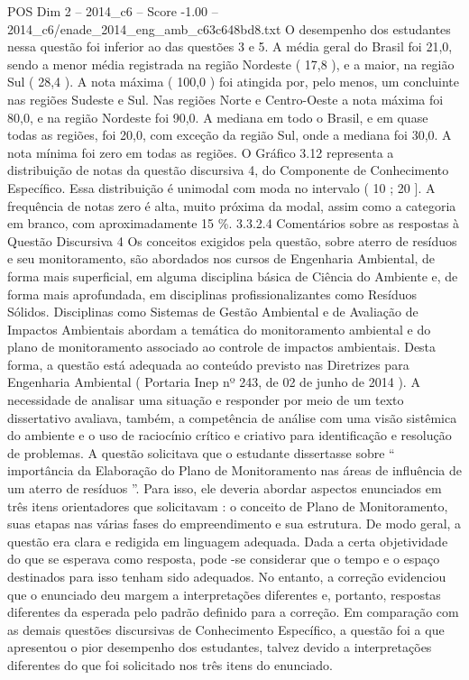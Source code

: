 \begin{textsample}{POS Dim 2 – 2014\_c6 – Score -1.00 – 2014\_c6/enade\_2014\_eng\_amb\_c63c648bd8.txt}
O desempenho dos estudantes nessa questão foi inferior ao das questões 3 e 5.
A média geral do Brasil foi 21,0, sendo a menor média registrada na região Nordeste ( 17,8 ), e a maior, na região Sul ( 28,4 ).
A nota máxima ( 100,0 ) foi atingida por, pelo menos, um concluinte nas regiões Sudeste e Sul.
Nas regiões Norte e Centro-Oeste a nota máxima foi 80,0, e na região Nordeste foi 90,0.
A mediana em todo o Brasil, e em quase todas as regiões, foi 20,0, com exceção da região Sul, onde a mediana foi 30,0.
A nota mínima foi zero em todas as regiões.
O Gráfico 3.12 representa a distribuição de notas da questão discursiva 4, do Componente de Conhecimento Específico.
Essa distribuição é unimodal com moda no intervalo ( 10 ; 20 ].
A frequência de notas zero é alta, muito próxima da modal, assim como a categoria em branco, com aproximadamente 15 \%. 3.3.2.4 Comentários sobre as respostas à Questão Discursiva 4 Os conceitos exigidos pela questão, sobre aterro de resíduos e seu monitoramento, são abordados nos cursos de Engenharia Ambiental, de forma mais superficial, em alguma disciplina básica de Ciência do Ambiente e, de forma mais aprofundada, em disciplinas profissionalizantes como Resíduos Sólidos.
Disciplinas como Sistemas de Gestão Ambiental e de Avaliação de Impactos Ambientais abordam a temática do monitoramento ambiental e do plano de monitoramento associado ao controle de impactos ambientais.
Desta forma, a questão está adequada ao conteúdo previsto nas Diretrizes para Engenharia Ambiental ( Portaria Inep nº 243, de 02 de junho de 2014 ).
A necessidade de analisar uma situação e responder por meio de um texto dissertativo avaliava, também, a competência de análise com uma visão sistêmica do ambiente e o uso de raciocínio crítico e criativo para identificação e resolução de problemas.
A questão solicitava que o estudante dissertasse sobre “ importância da Elaboração do Plano de Monitoramento nas áreas de influência de um aterro de resíduos ”.
Para isso, ele deveria abordar aspectos enunciados em três itens orientadores que solicitavam : o conceito de Plano de Monitoramento, suas etapas nas várias fases do empreendimento e sua estrutura.
De modo geral, a questão era clara e redigida em linguagem adequada.
Dada a certa objetividade do que se esperava como resposta, pode -se considerar que o tempo e o espaço destinados para isso tenham sido adequados.
No entanto, a correção evidenciou que o enunciado deu margem a interpretações diferentes e, portanto, respostas diferentes da esperada pelo padrão definido para a correção.
Em comparação com as demais questões discursivas de Conhecimento Específico, a questão foi a que apresentou o pior desempenho dos estudantes, talvez devido a interpretações diferentes do que foi solicitado nos três itens do enunciado.

\end{textsample}
